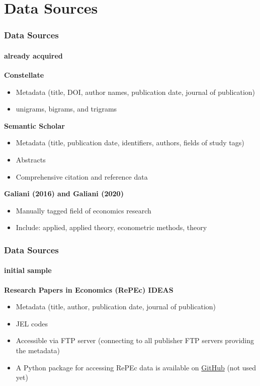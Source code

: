 \documentclass[aspectratio=1610]{beamer}
\begin{document}
\section{Data Sources}

\begin{frame}
	\frametitle{Data Sources}
	\framesubtitle{already acquired}

	\textbf{Constellate}
	\begin{itemize}
		\item Metadata (title, DOI, author names, publication date, journal of publication)
		\item unigrams, bigrams, and trigrams
	\end{itemize}

	\textbf{Semantic Scholar}
	\begin{itemize}
		\item Metadata (title, publication date, identifiers, authors, fields of study tags)
		\item Abstracts
		\item Comprehensive citation and reference data
	\end{itemize}

	\textbf{Galiani (2016) and Galiani (2020)}
	\begin{itemize}
		\item Manually tagged field of economics research
		\item Include: applied, applied theory, econometric methods, theory
	\end{itemize}
\end{frame}

\begin{frame}
	\frametitle{Data Sources}
	\framesubtitle{initial sample}

	\textbf{Research Papers in Economics (RePEc) IDEAS}
	\begin{itemize}
		\item Metadata (title, author, publication date, journal of publication)
		\item JEL codes
		\item Accessible via FTP server (connecting to all publisher FTP servers providing the metadata)
		\item A Python package for accessing RePEc data is available on \href{https://github.com/andrei-dubovik/repec}{GitHub} (not used yet)
	\end{itemize}
\end{frame}
\end{document}
